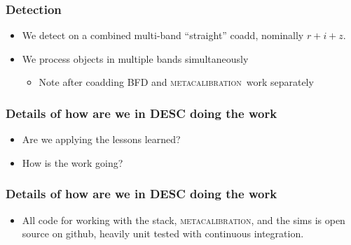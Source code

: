 \documentclass{beamer}
\newcommand{\mcal}{\textsc{metacalibration}}
\begin{document}
\frame
{

    \frametitle{Detection}


    \begin{itemize}

        \item We detect on a combined multi-band ``straight'' coadd, nominally
            $r+i+z$.

        \item We process objects in multiple bands simultaneously 

            \begin{itemize}

                \item Note after coadding BFD and \mcal\ work separately

            \end{itemize}

    \end{itemize}

}

\frame
{

    \frametitle{Details of how are we in DESC doing the work}

    \begin{itemize}

        \item Are we applying the lessons learned?

        \item How is the work going?

    \end{itemize}

}

\frame
{

    \frametitle{Details of how are we in DESC doing the work}

    \begin{itemize}

        \item All code for working with the stack, \mcal, and the sims is
            open source on github, heavily unit tested with continuous
            integration.

    \end{itemize}

}
\end{document}

